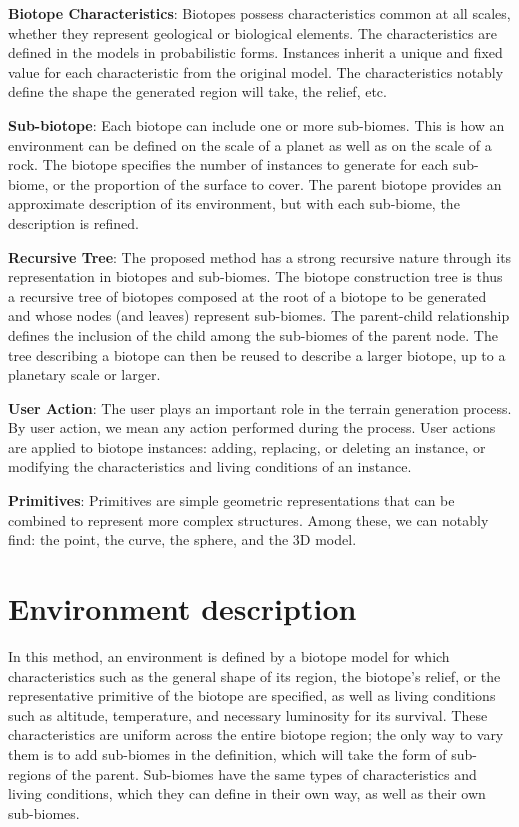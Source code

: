 \textbf{Biotope Characteristics}: Biotopes possess characteristics common at all scales, whether they represent geological or biological elements. The characteristics are defined in the models in probabilistic forms. Instances inherit a unique and fixed value for each characteristic from the original model. The characteristics notably define the shape the generated region will take, the relief, etc.

\textbf{Sub-biotope}: Each biotope can include one or more sub-biomes. This is how an environment can be defined on the scale of a planet as well as on the scale of a rock. The biotope specifies the number of instances to generate for each sub-biome, or the proportion of the surface to cover. The parent biotope provides an approximate description of its environment, but with each sub-biome, the description is refined.

\textbf{Recursive Tree}: The proposed method has a strong recursive nature through its representation in biotopes and sub-biomes. The biotope construction tree is thus a recursive tree of biotopes composed at the root of a biotope to be generated and whose nodes (and leaves) represent sub-biomes. The parent-child relationship defines the inclusion of the child among the sub-biomes of the parent node. The tree describing a biotope can then be reused to describe a larger biotope, up to a planetary scale or larger.

\textbf{User Action}: The user plays an important role in the terrain generation process. By user action, we mean any action performed during the process. User actions are applied to biotope instances: adding, replacing, or deleting an instance, or modifying the characteristics and living conditions of an instance.

\textbf{Primitives}: Primitives are simple geometric representations that can be combined to represent more complex structures. Among these, we can notably find: the point, the curve, the sphere, and the 3D model.

\section{Environment description}
\label{sec:influence-on-env-objects_environment-description}
In this method, an environment is defined by a biotope model for which characteristics such as the general shape of its region, the biotope's relief, or the representative primitive of the biotope are specified, as well as living conditions such as altitude, temperature, and necessary luminosity for its survival. These characteristics are uniform across the entire biotope region; the only way to vary them is to add sub-biomes in the definition, which will take the form of sub-regions of the parent. Sub-biomes have the same types of characteristics and living conditions, which they can define in their own way, as well as their own sub-biomes.

